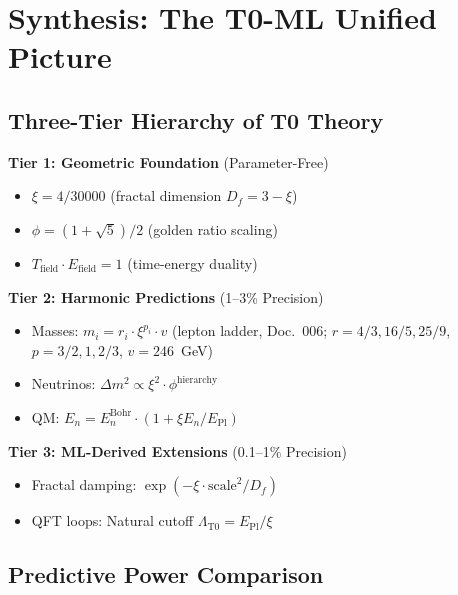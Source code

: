 	\section{Synthesis: The T0-ML Unified Picture}
	
	\subsection{Three-Tier Hierarchy of T0 Theory}
	
	\begin{tcolorbox}[colback=blue!5!white,colframe=blue!75!black,title={T0 Theoretical Structure}]
		\textbf{Tier 1: Geometric Foundation} (Parameter-Free)
		\begin{itemize}
			\item $\xi = 4/30000$ (fractal dimension $D_f=3-\xi$)
			\item $\phi = (1+\sqrt{5})/2$ (golden ratio scaling)
			\item $T_{\text{field}} \cdot E_{\text{field}} = 1$ (time-energy duality)
		\end{itemize}
		
		\textbf{Tier 2: Harmonic Predictions} (1--3\% Precision)
		\begin{itemize}
			\item Masses: $m_i = r_i \cdot \xi^{p_i} \cdot v$ (lepton ladder, Doc.~006; $r = 4/3, 16/5, 25/9$, $p = 3/2, 1, 2/3$, $v = 246$~GeV)
			\item Neutrinos: $\Delta m^2 \propto \xi^2 \cdot \phi^{\text{hierarchy}}$
			\item QM: $E_n = E_n^{\text{Bohr}} \cdot (1 + \xi E_n/E_{\text{Pl}})$
		\end{itemize}
		
		\textbf{Tier 3: ML-Derived Extensions} (0.1--1\% Precision)
		\begin{itemize}
			\item Fractal damping: $\exp(-\xi \cdot \text{scale}^2/D_f)$
			\item QFT loops: Natural cutoff $\Lambda_{\text{T0}} = E_{\text{Pl}}/\xi$
		\end{itemize}
	\end{tcolorbox}
	
	\subsection{Predictive Power Comparison}
	
